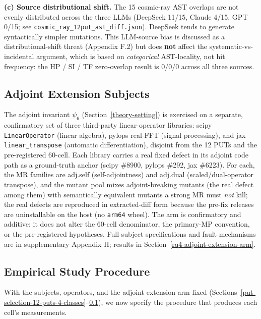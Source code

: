 \documentclass[12pt]{article}
\begin{document}
\textbf{(c) Source distributional shift.} The 15 cosmic-ray AST
overlaps are not evenly distributed across the three LLMs (DeepSeek
11/15, Claude 4/15, GPT 0/15; see
\texttt{cosmic\_ray\_12put\_ast\_diff.json}). DeepSeek tends to generate
syntactically simpler mutations. This LLM-source bias is discussed as a
distributional-shift threat
(Appendix F.2) but does \textbf{not} affect the systematic-vs-incidental
argument, which is based on \emph{categorical} AST-locality, not hit
frequency: the HP / SI / TF zero-overlap result is 0/0/0 across all
three sources.

\subsection{Adjoint Extension Subjects}\label{adjoint-extension-arm-subjects}

The adjoint invariant $\psi_6$ (Section~\ref{theory-setting}) is exercised on a separate,
confirmatory set of three third-party linear-operator libraries:
scipy \texttt{LinearOperator} (linear algebra), pylops real-FFT (signal
processing), and jax \texttt{linear\_transpose} (automatic
differentiation), disjoint from the 12 PUTs and the pre-registered
60-cell. Each library carries a real fixed defect in its adjoint code
path as a ground-truth anchor (scipy \#8900, pylops \#292, jax \#6223).
For each, the MR families are adj.self (self-adjointness) and adj.dual
(scaled/dual-operator transpose), and the mutant pool mixes
adjoint-breaking mutants (the real defect among them) with semantically
equivalent mutants a strong MR must \emph{not} kill; the real defects are
reproduced in extracted-diff form because the pre-fix releases are
uninstallable on the host (no \texttt{arm64} wheel). The arm is
confirmatory and additive: it does not alter the 60-cell denominator, the
primary-MP convention, or the pre-registered hypotheses. Full subject
specifications and fault mechanisms are in supplementary Appendix H;
results in Section~\ref{rq4-adjoint-extension-arm}.

\subsection{Empirical Study Procedure}\label{procedure-overview}

With the subjects, operators, and the adjoint extension arm fixed
(Sections~\ref{put-selection-12-puts-4-classes}--\ref{adjoint-extension-arm-subjects}), we now specify the procedure that produces each cell's
measurements.
\end{document}
